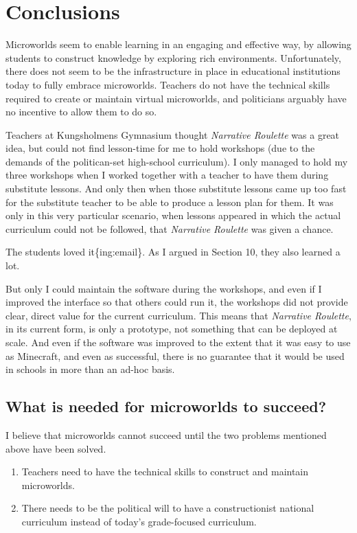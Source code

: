 \section{Conclusions}

Microworlds seem to enable learning in an engaging and effective way, by
allowing students to construct knowledge by exploring rich environments.
Unfortunately, there does not seem to be the infrastructure in place in
educational institutions today to fully embrace microworlds. Teachers do
not have the technical skills required to create or maintain virtual
microworlds, and politicians arguably have no incentive to allow them to
do so.

Teachers at Kungsholmens Gymnasium thought \emph{Narrative Roulette} was
a great idea, but could not find lesson-time for me to hold workshops
(due to the demands of the politican-set high-school curriculum). I only
managed to hold my three workshops when I worked together with a teacher
to have them during substitute lessons. And only then when those
substitute lessons came up too fast for the substitute teacher to be
able to produce a lesson plan for them. It was only in this very
particular scenario, when lessons appeared in which the actual
curriculum could not be followed, that \emph{Narrative Roulette} was
given a chance.

The students loved it\{ing:email\}. As I argued in Section 10, they also
learned a lot.

But only I could maintain the software during the workshops, and even if
I improved the interface so that others could run it, the workshops did
not provide clear, direct value for the current curriculum. This means
that \emph{Narrative Roulette}, in its current form, is only a
prototype, not something that can be deployed at scale. And even if the
software was improved to the extent that it was easy to use as
Minecraft, and even as successful, there is no guarantee that it would
be used in schools in more than an ad-hoc basis.

\subsection{What is needed for microworlds to succeed?}

I believe that microworlds cannot succeed until the two problems
mentioned above have been solved.

\begin{enumerate}[1.]
\item
  Teachers need to have the technical skills to construct and maintain
  microworlds.
\item
  There needs to be the political will to have a constructionist
  national curriculum instead of today's grade-focused curriculum.
\end{enumerate}

